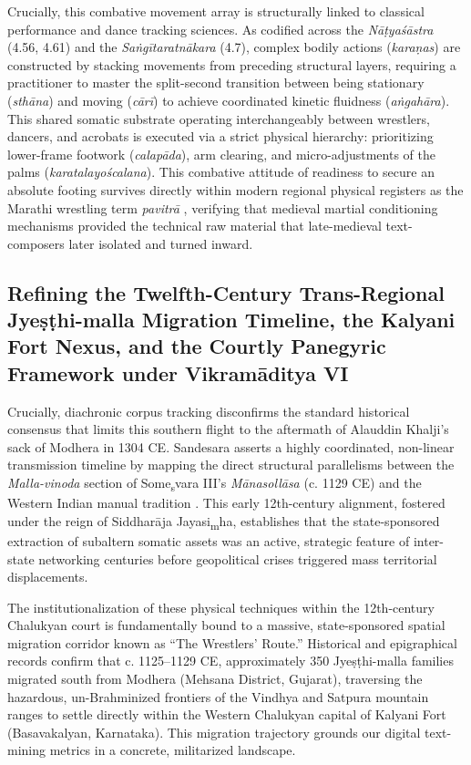 \documentclass[11pt,twoside,letterpaper]{article}
\begin{document}
Crucially, this combative movement array is structurally linked to classical performance and dance tracking sciences. As codified across the \textit{Nāṭyaśāstra} (4.56, 4.61) and the \textit{Saṅgītaratnākara} (4.7), complex bodily actions (\textit{karaṇas}) are constructed by stacking movements from preceding structural layers, requiring a practitioner to master the split-second transition between being stationary (\textit{sthāna}) and moving (\textit{cārī}) to achieve coordinated kinetic fluidness (\textit{aṅgahāra}). This shared somatic substrate operating interchangeably between wrestlers, dancers, and acrobats is executed via a strict physical hierarchy: prioritizing lower-frame footwork (\textit{calapāda}), arm clearing, and micro-adjustments of the palms (\textit{karatalayoścalana}). This combative attitude of readiness to secure an absolute footing survives directly within modern regional physical registers as the Marathi wrestling term \textit{pavitrā} \cite{Patwardhan1927}, verifying that medieval martial conditioning mechanisms provided the technical raw material that late-medieval text-composers later isolated and turned inward.

\subsection{Refining the Twelfth-Century Trans-Regional Jyeṣṭhi-malla  Migration Timeline, the Kalyani Fort Nexus, and the Courtly Panegyric Framework under Vikram\={a}ditya VI }
Crucially, diachronic corpus tracking disconfirms the standard historical consensus that limits this southern flight to the aftermath of Alauddin Khalji's sack of Modhera in 1304 CE. Sandesara asserts a highly coordinated, non-linear transmission timeline by mapping the direct structural parallelisms between the \textit{Malla-vinoda} section of Some\textsubscript{s}vara III’s \textit{M\={a}nasoll\={a}sa} (c. 1129 CE) and the Western Indian manual tradition \cite{Sandesara1948}. This early 12th-century alignment, fostered under the reign of Siddhar\={a}ja Jayasi\textsubscript{m}ha, establishes that the state-sponsored extraction of subaltern somatic assets was an active, strategic feature of inter-state networking centuries before geopolitical crises triggered mass territorial displacements.

The institutionalization of these physical techniques within the 12th-century Chalukyan court is fundamentally bound to a massive, state-sponsored spatial migration corridor known as ``The Wrestlers’ Route.'' Historical and epigraphical records confirm that c. 1125--1129 CE, approximately 350 Jyeṣṭhi-malla families migrated south from Modhera (Mehsana District, Gujarat), traversing the hazardous, un-Brahminized frontiers of the Vindhya and Satpura mountain ranges to settle directly within the Western Chalukyan capital of Kalyani Fort (Basavakalyan, Karnataka). This migration trajectory grounds our digital text-mining metrics in a concrete, militarized landscape. 
\end{document}
